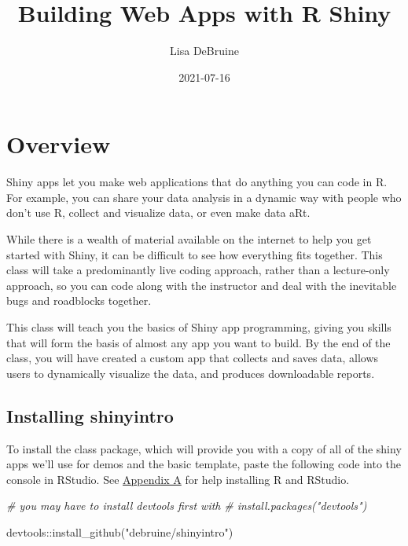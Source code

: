 \documentclass[
]{book}
\title{Building Web Apps with R Shiny}
\author{Lisa DeBruine}
\date{2021-07-16}
\newenvironment{Shaded}{\begin{snugshade}}{\end{snugshade}}
\newcommand{\CommentTok}[1]{\textcolor[rgb]{0.56,0.35,0.01}{\textit{#1}}}
\newcommand{\FunctionTok}[1]{\textcolor[rgb]{0.00,0.00,0.00}{#1}}
\newcommand{\NormalTok}[1]{#1}
\newcommand{\SpecialCharTok}[1]{\textcolor[rgb]{0.00,0.00,0.00}{#1}}
\newcommand{\StringTok}[1]{\textcolor[rgb]{0.31,0.60,0.02}{#1}}
\begin{document}
\maketitle

{
\setcounter{tocdepth}{1}
\tableofcontents
}
\hypertarget{overview}{%
\chapter*{Overview}\label{overview}}

Shiny apps let you make web applications that do anything you can code in R. For example, you can share your data analysis in a dynamic way with people who don't use R, collect and visualize data, or even make data aRt.

While there is a wealth of material available on the internet to help you get started with Shiny, it can be difficult to see how everything fits together. This class will take a predominantly live coding approach, rather than a lecture-only approach, so you can code along with the instructor and deal with the inevitable bugs and roadblocks together.

This class will teach you the basics of Shiny app programming, giving you skills that will form the basis of almost any app you want to build. By the end of the class, you will have created a custom app that collects and saves data, allows users to dynamically visualize the data, and produces downloadable reports.

\hypertarget{installing-shinyintro}{%
\section{Installing shinyintro}\label{installing-shinyintro}}

To install the class package, which will provide you with a copy of all of the shiny apps we'll use for demos and the basic template, paste the following code into the console in RStudio. See \protect\hyperlink{installing-r}{Appendix A} for help installing R and RStudio.

\begin{Shaded}
\begin{Highlighting}[]
\CommentTok{\# you may have to install devtools first with }
\CommentTok{\# install.packages("devtools")}

\NormalTok{devtools}\SpecialCharTok{::}\FunctionTok{install\_github}\NormalTok{(}\StringTok{"debruine/shinyintro"}\NormalTok{)}
\end{Highlighting}
\end{Shaded}
\end{document}
